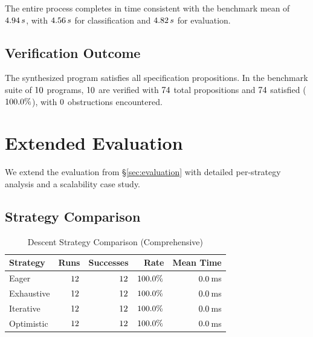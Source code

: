 \documentclass[11pt]{article}
\begin{document}
The entire process completes in time consistent with the benchmark
mean of $4.94\,s$, with $4.56\,s$
for classification and $4.82\,s$ for evaluation.

\subsection{Verification Outcome}

The synthesized program satisfies all specification propositions.
In the benchmark suite of $10$ programs,
$10$ are verified with $74$ total
propositions and $74$ satisfied
($100.0\%$), with $0$ obstructions
encountered.

\section{Extended Evaluation}\label{sec:extended-eval}

We extend the evaluation from \S\ref{sec:evaluation} with detailed
per-strategy analysis and a scalability case study.

\subsection{Strategy Comparison}

\begin{table}[H]
\centering
\caption{Descent Strategy Comparison (Comprehensive)}
\label{tab:strategy-comparison}
\begin{tabular}{lrrrr}
\toprule
\textbf{Strategy} & \textbf{Runs} & \textbf{Successes}
  & \textbf{Rate} & \textbf{Mean Time} \\
\midrule
Eager & $12$
  & $12$ & $100.0\%$
  & $0.0$\,ms \\
Exhaustive & $12$
  & $12$
  & $100.0\%$
  & $0.0$\,ms \\
Iterative & $12$
  & $12$
  & $100.0\%$
  & $0.0$\,ms \\
Optimistic & $12$
  & $12$
  & $100.0\%$
  & $0.0$\,ms \\
\bottomrule
\end{tabular}
\end{table}
\end{document}
